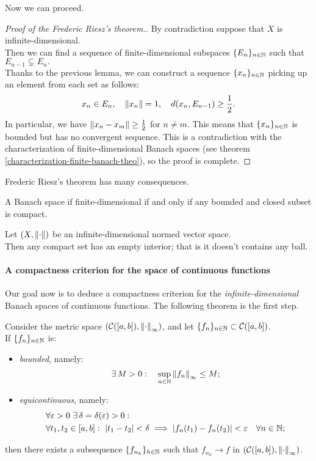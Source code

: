 Now we can proceed.

\begin{proof}[Proof of the Frederic Riesz's theorem.]
	By contradiction suppose that $X$ is infinite-dimensional.\\
	Then we can find a sequence of finite-dimensional subspaces $\{E_n\}_{n\in \mathbb N}$ such that $E_{n-1} \subsetneq E_n.$\\
	Thanks to the previous lemma, we can construct a sequence $\{x_n\}_{n \in \mathbb N}$ picking up an element from each set as follows:
	$$x_n \in E_n, \quad \left\lVert x_n\right\rVert = 1, \quad d(x_n, E_{n-1})\geq \frac{1}{2}.$$
	In particular, we have $\left\lVert x_n - x_m\right\rVert \geq \frac 1 2$ for $n \neq m$. This means that $\{x_n\}_{n \in \mathbb N}$ is bounded but has no convergent sequence. This is a contradiction with the characterization of finite-dimensional Banach spaces (see theorem \vref{characterization-finite-banach-theo}), so the proof is complete.
\end{proof}

Frederic Riesz's theorem has many consequences.

\begin{coro}
	A Banach space if finite-dimensional if and only if any bounded and closed subset is compact. 
\end{coro}

\begin{coro}
	Let $(X, \left\lVert\cdot\right\rVert)$ be an infinite-dimensional normed vector space.\\ 
	Then any compact set has an empty interior; that is it doesn't contains any ball.
\end{coro}

\paragraph{A compactness criterion for the space of continuous functions} Our goal now is to deduce a compactness criterion for the \textit{infinite-dimensional} Banach spaces of continuous functions. The following theorem is the first step.

\begin{theo} \label{theo-ascoli-arzela}
	Consider the metric space $(\mathcal C([a,b]),\left\lVert\cdot\right\rVert_\infty)$, and let $\{f_n\}_{n \in \mathbb N} \subset \mathcal C([a,b])$.\\
	If $\{f_n\}_{n \in \mathbb N}$ is:
	\begin{itemize}
		\item\emph{bounded}, namely:
		$$
		\exists \, M > 0 : \quad 
		\sup_{n \in \mathbb N} \left\lVert f_n\right\rVert_\infty 
		\leq M
		;
		$$
		\item\emph{equicontinuous}, namely:
		\begin{align*}
		&\forall \eps > 0 \ 
		\exists \, \delta = \delta (\eps) > 0:\\
		&\forall t_1, t_2 \in [a,b] : 
		\ |t_1-t_2|< \delta
		\implies
		|f_n(t_1)-f_n(t_2)|
		<\eps
		\quad \forall n 
		\in \NN
		;
		\end{align*}
	\end{itemize}
	then there exists a subsequence $\{f_{n_h}\}_{h\in\mathbb N}$ such that $f_{n_h} \to f$ in $(\mathcal C([a,b]), \left\lVert\cdot\right\rVert_\infty)$.
\end{theo}

